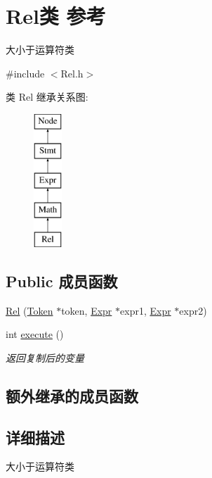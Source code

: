 \hypertarget{class_rel}{}\section{Rel类 参考}
\label{class_rel}


大小于运算符类  




{\ttfamily \#include $<$Rel.\+h$>$}

类 Rel 继承关系图\+:\begin{figure}[H]
\begin{center}
\leavevmode
\includegraphics[height=5.000000cm]{class_rel}
\end{center}
\end{figure}
\subsection*{Public 成员函数}
\begin{DoxyCompactItemize}
\item 
\hyperlink{class_rel_a1f60bc90adde19ed35f26ea8b2cfd91c}{Rel} (\hyperlink{class_token}{Token} $\ast$token, \hyperlink{class_expr}{Expr} $\ast$expr1, \hyperlink{class_expr}{Expr} $\ast$expr2)
\item 
\mbox{\label{class_rel_a82b2f3b75a2b9e81631f2659d42a36d1}} 
int \hyperlink{class_rel_a82b2f3b75a2b9e81631f2659d42a36d1}{execute} ()
\begin{DoxyCompactList}\small\item\em 返回复制后的变量 \end{DoxyCompactList}\end{DoxyCompactItemize}
\subsection*{额外继承的成员函数}


\subsection{详细描述}
大小于运算符类 

